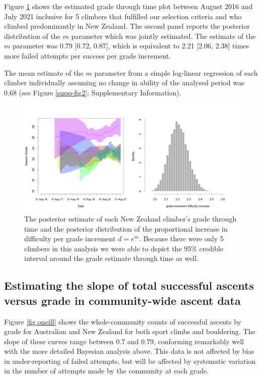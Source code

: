 \documentclass{article}
\newcommand{\Cnz}{5}
\newcommand{\meanmnz}{0.79}
\newcommand{\lowmnz}{0.72}
\newcommand{\highmnz}{0.87}
\newcommand{\meandnz}{2.21}
\newcommand{\lowdnz}{2.06}
\newcommand{\highdnz}{2.38}
\newcommand{\meanregmnz}{0.68}
\begin{document}
Figure \ref{nz_ascents} shows the estimated grade through time plot between August 2016 and July 2021 inclusive for \Cnz{} climbers that fulfilled our selection criteria and who climbed predominantly in New Zealand. The second panel reports the posterior distribution of the $m$ parameter which was jointly estimated.
The estimate of the $m$ parameter was \meanmnz{} [\lowmnz, \highmnz], which is equivalent to \meandnz{} [\lowdnz, \highdnz] times more failed attempts per success per grade increment. 

The mean estimate of the $m$ parameter from a simple log-linear regression of each climber individually assuming no change in ability of the analysed period was \meanregmnz{} (see Figure \ref{supp-fig2}; Supplementary Information). 


\begin{figure}
\centering
\includegraphics[width=\textwidth]{../results/nz/ascents-from-2016-08-01-to-2021-08-01-minAscents400-minFails1-session-posterior.png}
\caption{\small The posterior estimate of each New Zealand climber's grade through time and the posterior distribution of the proportional increase in difficulty per grade increment $d = e^m$. Because there were only \Cnz{} climbers in this analysis we were able to depict the 95\% credible interval around the grade estimate through time as well.}
\label{nz_ascents}
\end{figure}


\subsection*{Estimating the slope of total successful ascents versus grade in community-wide ascent data}

Figure \ref{fig.oneill} shows the whole-community counts of successful ascents by grade for Australian and New Zealand for both sport climbs and bouldering. The slope of these curves range between 0.7 and 0.79, conforming remarkably well with the more detailed Bayesian analysis above. This data is not affected by bias in under-reporting of failed attempts, but will be affected by systematic variation in the number of attempts made by the community at each grade.
\end{document}
